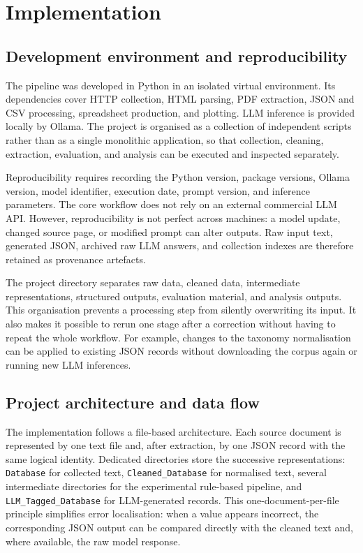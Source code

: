 \chapter{Implementation}

\section{Development environment and reproducibility}

The pipeline was developed in Python in an isolated virtual environment. Its
dependencies cover HTTP collection, HTML parsing, PDF extraction, JSON and CSV
processing, spreadsheet production, and plotting. LLM inference is provided
locally by Ollama. The project is organised as a collection of independent
scripts rather than as a single monolithic application, so that collection,
cleaning, extraction, evaluation, and analysis can be executed and inspected
separately.

Reproducibility requires recording the Python version, package versions, Ollama
version, model identifier, execution date, prompt version, and inference
parameters. The core workflow does not rely on an external commercial LLM API.
However, reproducibility is not perfect across machines: a model update, changed
source page, or modified prompt can alter outputs. Raw input text, generated
JSON, archived raw LLM answers, and collection indexes are therefore retained as
provenance artefacts.

The project directory separates raw data, cleaned data, intermediate
representations, structured outputs, evaluation material, and analysis outputs.
This organisation prevents a processing step from silently overwriting its
input. It also makes it possible to rerun one stage after a correction without
having to repeat the whole workflow. For example, changes to the taxonomy
normalisation can be applied to existing JSON records without downloading the
corpus again or running new LLM inferences.

\section{Project architecture and data flow}

The implementation follows a file-based architecture. Each source document is
represented by one text file and, after extraction, by one JSON record with the
same logical identity. Dedicated directories store the successive
representations: \texttt{Database} for collected text, \texttt{Cleaned\_Database}
for normalised text, several intermediate directories for the experimental
rule-based pipeline, and \texttt{LLM\_Tagged\_Database} for LLM-generated
records. This one-document-per-file principle simplifies error localisation:
when a value appears incorrect, the corresponding JSON output can be compared
directly with the cleaned text and, where available, the raw model response.

